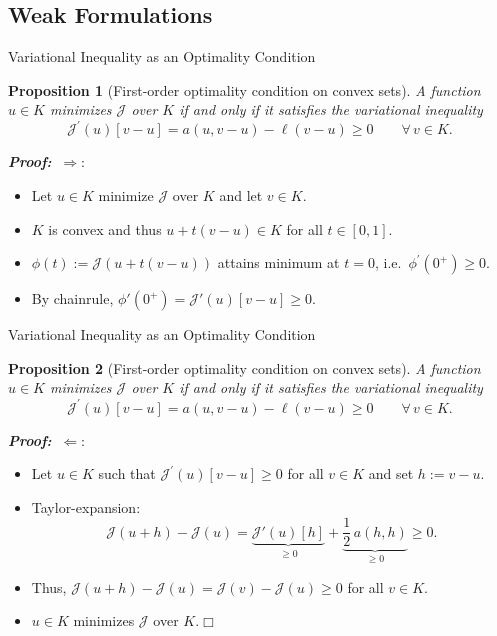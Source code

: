 \documentclass[10pt,aspectratio=169]{beamer}
\newtheorem{proposition}{Proposition}[section]
\def\cJ{{\mathcal J}}
\def\eop{\hfill{$\Box$}}
\begin{document}
\subsection{Weak Formulations}

\begin{frame}{Variational Inequality as an Optimality Condition}
	\begin{proposition}[First-order optimality condition on convex sets]
		A function $u\in K$ minimizes $\cJ$ over $K$ if and only if it satisfies the variational inequality
		\begin{equation*}
			\cJ^\prime(u)[v-u] =  a(u,v-u)-\ell(v-u) \ge 0\qquad\forall\, v\in K.
		\end{equation*}
	\end{proposition}
	\textbf{\em Proof:} $\ \Longrightarrow:$
	\begin{itemize}
		\item Let $u\in K$ minimize $\cJ$ over $K$ and let $v\in K$.
		\item $K$ is convex and thus $u+t(v-u)\in K$ for all $t\in[0,1]$.
		\item $\phi(t):= \cJ(u+t(v-u))$ attains minimum at $t = 0$, i.e.\ $\phi^\prime(0^+)\ge 0$.
		\item By chainrule, $\phi'(0^+)=\cJ'(u)[v-u]\ge 0$.
	\end{itemize}
\end{frame}

\begin{frame}{Variational Inequality as an Optimality Condition}
	\begin{proposition}[First-order optimality condition on convex sets]
		A function $u\in K$ minimizes $\cJ$ over $K$ if and only if it satisfies the variational inequality
		\begin{equation*}
			\cJ^\prime(u)[v-u] =  a(u,v-u)-\ell(v-u) \ge 0\qquad\forall\, v\in K.
		\end{equation*}
	\end{proposition}
	\textbf{\em Proof:} $\ \Longleftarrow:$
	\begin{itemize}
		\item Let $u\in K$ such that  $\cJ^\prime(u)[v-u]\ge 0$ for all $v\in K$ and set $h:= v-u$.
		\item Taylor-expansion:
		      \begin{equation*}
			      \cJ(u+h)-\cJ(u)=\underbrace{\cJ'(u)[h]}_{\ge 0}+\underbrace{\frac12\,a(h,h)}_{\ge 0} \ge 0.
		      \end{equation*}
		\item Thus, $\cJ(u+h)-\cJ(u) = \cJ(v)-\cJ(u)\ge 0$ for all $v\in K$.
		\item $u\in K$ minimizes $\cJ$ over $K$.\eop
	\end{itemize}
\end{frame}
\end{document}
